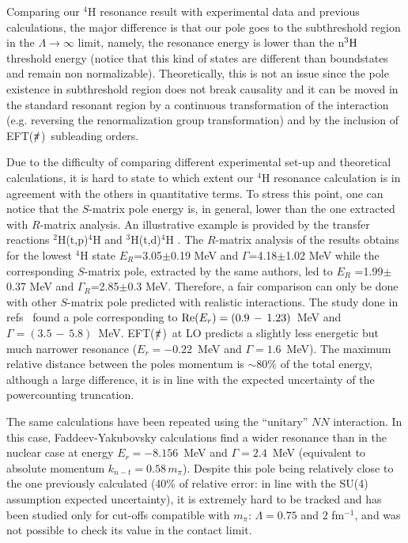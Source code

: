 \documentclass[5p,times]{elsarticle}
\newcommand{\eftnopi}{\mbox{EFT($\slashed{\pi}$) }}
\begin{document}
%
Comparing our $^4$H resonance result with experimental data and previous calculations, the major difference is that our pole goes to the subthreshold region in the $\Lambda\rightarrow\infty$ limit, namely, the resonance energy is lower than the n$^3{\rm H}$ threshold energy (notice that this kind of states are different than boundstates and remain non normalizable).
Theoretically, this is not an issue since the pole existence in subthreshold region does not break causality and it can be moved in the standard resonant region by a continuous transformation of the interaction (e.g. reversing the renormalization group transformation) and by the inclusion of \eftnopi subleading orders. 
%

%
Due to the difficulty of comparing different experimental set-up and theoretical calculations, it is hard to state to which extent our $^4$H resonance calculation is in agreement with the others in quantitative terms. 
%
To stress this point, one can notice that the $S$-matrix pole energy is, in general, lower than the one extracted with $R$-matrix analysis.
An illustrative example is provided by the  transfer reactions $^2$H(t,p)$^4$H and $^3$H(t,d)$^4$H \cite{Sidorchuk:2004ntw}. 
The $R$-matrix analysis of the results obtains for the lowest $^4$H state $E_R$=3.05$\pm$0.19 MeV and $\Gamma$=4.18$\pm$1.02 MeV while the corresponding $S$-matrix pole, extracted by the same authors, led to $E_R$ =1.99$\pm$0.37 MeV and $\Gamma_R$=2.85$\pm$0.3 MeV. 
Therefore, a fair comparison can only be done with other $S$-matrix pole predicted with realistic interactions. 
%
The study done in refs~\cite{Lazauskas:2019hil,Arai:2003ek, deDiego:2007rd} found a pole corresponding to ${\rm Re}(E_r)=(0.9\,-\,1.23)$~MeV and $\Gamma=(3.5\,-\,5.8)$~MeV.
\eftnopi at LO predicts a slightly less energetic but much narrower resonance ($E_r=-0.22$~MeV and $\Gamma=1.6$~MeV). 
The maximum relative distance between the poles momentum is $\sim 80\%$ of the total energy, although a large difference, it is in line with the expected uncertainty of the powercounting truncation.
%

%
The same calculations have been repeated using the ``unitary'' $NN$ interaction. In this case, Faddeev-Yakubovsky calculations find a wider resonance than in the nuclear case at energy $E_r=-8.156$~MeV and $\Gamma=2.4$~MeV (equivalent to absolute momentum $k_{n-t}=0.58\,m_\pi$). 
Despite this pole being relatively close to the one previously calculated (40\% of relative error: in line with the SU(4) assumption expected uncertainty), it is extremely hard to be tracked and has been studied only for cut-offs compatible with $m_\pi$: $\Lambda=0.75$ and $2$ fm$^{-1}$, and was not possible to check its value in the contact limit.
\end{document}
